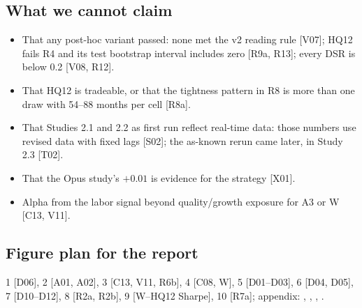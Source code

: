 \subsection*{What we cannot claim}
\begin{itemize}
\item That any post-hoc variant passed: none met the v2 reading rule [V07]; HQ12 fails R4 and its test bootstrap interval includes zero [R9a, R13]; every DSR is below 0.2 [V08, R12].
\item That HQ12 is tradeable, or that the tightness pattern in R8 is more than one draw with 54--88 months per cell [R8a].
\item That Studies 2.1 and 2.2 as first run reflect real-time data: those numbers use revised data with fixed lags [S02]; the as-known rerun came later, in Study 2.3 [T02].
\item That the Opus study's $+0.01$ is evidence for the strategy [X01].
\item Alpha from the labor signal beyond quality/growth exposure for A3 or W [C13, V11].
\end{itemize}

\subsection*{Figure plan for the report}
1  [D06], 2  [A01, A02], 3  [C13, V11, R6b], 4  [C08, W], 5  [D01--D03], 6  [D04, D05], 7  [D10--D12], 8  [R2a, R2b], 9  [W--HQ12 Sharpe], 10  [R7a]; appendix: , , , .

